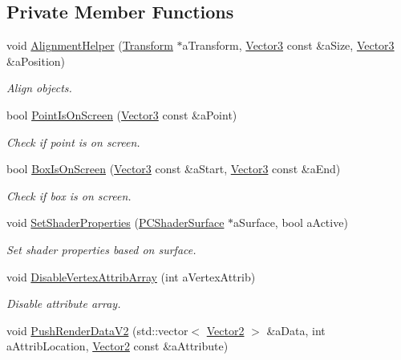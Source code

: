 \subsection*{Private Member Functions}
\begin{DoxyCompactItemize}
\item 
void \hyperlink{classPCShaderScreen_a65ff04e1bb49cc64cd97c93097f49965}{Alignment\+Helper} (\hyperlink{classTransform}{Transform} $\ast$a\+Transform, \hyperlink{structVector3}{Vector3} const \&a\+Size, \hyperlink{structVector3}{Vector3} \&a\+Position)
\begin{DoxyCompactList}\small\item\em Align objects. \end{DoxyCompactList}\item 
bool \hyperlink{classPCShaderScreen_a720903cbc3a327cc9c80649214500933}{Point\+Is\+On\+Screen} (\hyperlink{structVector3}{Vector3} const \&a\+Point)
\begin{DoxyCompactList}\small\item\em Check if point is on screen. \end{DoxyCompactList}\item 
bool \hyperlink{classPCShaderScreen_a5ac67fe5e24bc752e4a13e8adadae4b4}{Box\+Is\+On\+Screen} (\hyperlink{structVector3}{Vector3} const \&a\+Start, \hyperlink{structVector3}{Vector3} const \&a\+End)
\begin{DoxyCompactList}\small\item\em Check if box is on screen. \end{DoxyCompactList}\item 
void \hyperlink{classPCShaderScreen_a8b255847bf1959fff9fa5c61eb3803d6}{Set\+Shader\+Properties} (\hyperlink{classPCShaderSurface}{P\+C\+Shader\+Surface} $\ast$a\+Surface, bool a\+Active)
\begin{DoxyCompactList}\small\item\em Set shader properties based on surface. \end{DoxyCompactList}\item 
void \hyperlink{classPCShaderScreen_a07368c32e77b17dbefe6192780df466a}{Disable\+Vertex\+Attrib\+Array} (int a\+Vertex\+Attrib)
\begin{DoxyCompactList}\small\item\em Disable attribute array. \end{DoxyCompactList}\item 
void \hyperlink{classPCShaderScreen_ae6b398de132aea3477dec9b068c911e8}{Push\+Render\+Data\+V2} (std\+::vector$<$ \hyperlink{structVector2}{Vector2} $>$ \&a\+Data, int a\+Attrib\+Location, \hyperlink{structVector2}{Vector2} const \&a\+Attribute)

\end{DoxyCompactItemize}
